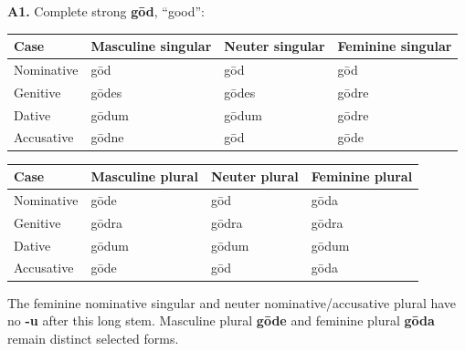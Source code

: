 \par\begin{minipage}{\linewidth}\raggedright
\textbf{A1.} Complete strong \textbf{gōd}, “good”:

\par\begingroup
\fontsize{10.5}{13.2}\selectfont
\setlength{\LTleft}{0pt}\setlength{\LTright}{\fill}
\noindent
\begin{tabular}{@{}>{\raggedright\arraybackslash}p{22.0mm}>{\raggedright\arraybackslash}p{31.188mm}>{\raggedright\arraybackslash}p{31.188mm}>{\raggedright\arraybackslash}p{31.188mm}@{}}
\toprule
\textbf{Case} & \textbf{Masculine singular} & \textbf{Neuter singular} & \textbf{Feminine singular} \\
\midrule
Nominative & gōd & gōd & gōd \\
Genitive & gōdes & gōdes & gōdre \\
Dative & gōdum & gōdum & gōdre \\
Accusative & gōdne & gōd & gōde \\
\bottomrule
\end{tabular}
\par\endgroup
\par\addvspace{5pt}
\par\begingroup
\fontsize{10.5}{13.2}\selectfont
\setlength{\LTleft}{0pt}\setlength{\LTright}{\fill}
\noindent
\begin{tabular}{@{}>{\raggedright\arraybackslash}p{22.0mm}>{\raggedright\arraybackslash}p{31.188mm}>{\raggedright\arraybackslash}p{31.188mm}>{\raggedright\arraybackslash}p{31.188mm}@{}}
\toprule
\textbf{Case} & \textbf{Masculine plural} & \textbf{Neuter plural} & \textbf{Feminine plural} \\
\midrule
Nominative & gōde & gōd & gōda \\
Genitive & gōdra & gōdra & gōdra \\
Dative & gōdum & gōdum & gōdum \\
Accusative & gōde & gōd & gōda \\
\bottomrule
\end{tabular}
\par\endgroup
The feminine nominative singular and neuter nominative/\allowbreak{}accusative plural have no \textbf{-u} after this long stem. Masculine plural \textbf{gōde} and feminine plural \textbf{gōda} remain distinct selected forms.

\end{minipage}\par\addvspace{4pt}

